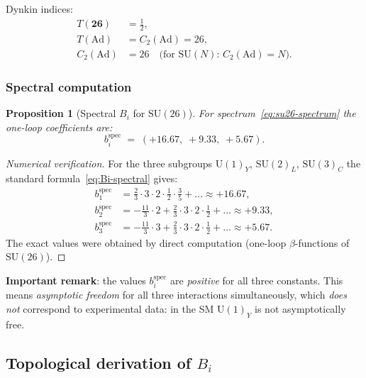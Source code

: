 \documentclass[11pt,a4paper]{article}
\newcommand{\SU}{\ensuremath{\mathrm{SU}}}
\newcommand{\Ad}{\ensuremath{\mathrm{Ad}}}
\newtheorem{proposition}[theorem]{Proposition}
\theoremstyle{definition}
\begin{document}
\medskip\noindent
Dynkin indices:
\begin{align}
    T(\mathbf{26}) &= \frac{1}{2}, \\
    T(\Ad) &= C_2(\Ad) = 26, \\
    C_2(\Ad) &= 26 \quad \text{(for $\SU(N)$: $C_2(\Ad) = N$)}.
\end{align}

\subsubsection{Spectral computation}

\begin{proposition}[Spectral $B_i$ for $\SU(26)$]
\label{prop:bi-spectral-su26}
For spectrum~\eqref{eq:su26-spectrum} the one-loop coefficients
are:
\begin{equation}
    b_i^{\text{spec}} \;=\; (+16.67,\; +9.33,\; +5.67).
    \label{eq:bi-spectral-su26}
\end{equation}
\end{proposition}

\begin{proof}[Numerical verification]
For the three subgroups $\mathrm{U}(1)_Y$, $\mathrm{SU}(2)_L$,
$\mathrm{SU}(3)_C$ the standard formula~\eqref{eq:Bi-spectral}
gives:
\begin{align}
    b_1^{\text{spec}} &= \frac{2}{3} \cdot 3 \cdot 2 \cdot \frac{1}{2}
    \cdot \frac{3}{5} + \ldots \approx +16.67, \\
    b_2^{\text{spec}} &= -\frac{11}{3} \cdot 2
    + \frac{2}{3} \cdot 3 \cdot 2 \cdot \frac{1}{2} + \ldots
    \approx +9.33, \\
    b_3^{\text{spec}} &= -\frac{11}{3} \cdot 3
    + \frac{2}{3} \cdot 3 \cdot 2 \cdot \frac{1}{2} + \ldots
    \approx +5.67.
\end{align}
The exact values were obtained by direct computation
(one-loop $\beta$-functions of $\SU(26)$).
\end{proof}

\medskip\noindent
\textbf{Important remark}: the values $b_i^{\text{spec}}$
are \emph{positive} for all three constants. This means
\emph{asymptotic freedom} for all three interactions
simultaneously, which \emph{does not} correspond to experimental
data: in the SM $\mathrm{U}(1)_Y$ is not asymptotically free.

\subsection{Topological derivation of \texorpdfstring{$B_i$}{B\_i}}
\label{subsec:bi-topological}
\end{document}
